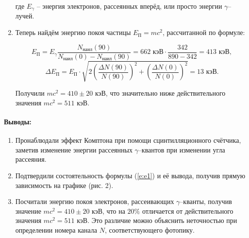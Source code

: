 \documentclass[a4paper,12pt]{article}
\begin{document}
\begin{enumerate}
\noindent где $E_\gamma$ -- энергия электронов, рассеянных вперёд, или просто энергии $\gamma$--лучей.

\item Теперь найдём энергию покоя частицы $E_\text{П} = mc^2$, рассчитанной по формуле:

\[
E_\text{П} = E_\gamma \frac{N_\text{наил}(90)}{N_\text{наил}(0) - N_\text{наил}(90)} = 662 \text{ кэВ} \cdot \frac{342}{890 - 342} = 413 \text{ кэВ},
\] \[
\Delta E_\text{П} = E_\text{П} \cdot \sqrt{2 \left( \frac{\Delta N(90)}{N(90)} \right)^2 + \left( \frac{\Delta N(0)}{N(0)} \right)^2} = 13 \text{ кэВ}.
\]

Получили $mc^2 = 410 \pm 20$ кэВ, что значительно ниже действительного значения $mc^2 = 511$ кэВ.
\end{enumerate}
\paragraph{Выводы:}
\begin{enumerate}
\item Пронаблюдали эффект Комптона при помощи сцинтилляционного счётчика, заметив изменение энергии рассеянных $\gamma$--квантов при изменении угла рассеяния.
\item Подтвердили состоятельность формулы (\ref{e:e1}) и её вывода, получив прямую зависимость на графике (рис. 2).
\item Посчитали энергию покоя электронов, рассеивающих $\gamma$--кванты, получив значение $mc^2 = 410 \pm 20$ кэВ, что на $20\%$ отличается от действительного значения $mc^2 = 511$ кэВ. Это различие можно объяснить неточностью при определении номера канала $N$, соответствующего фотопику.
\end{enumerate}
\end{document}
